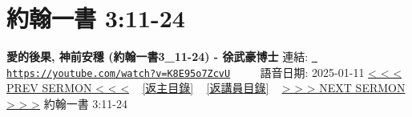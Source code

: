 \documentclass{book}
\begin{document}
\section{約翰一書 3:11-24}
\label{sec:K8E95o7ZcvU}
\textbf{愛的後果, 神前安穩 (約翰一書3\_11-24) - 徐武豪博士}
\newline
\newline
連結: \href{https://youtube.com/watch?v=K8E95o7ZcvU}{\texttt{ https://youtube.com/watch?v=K8E95o7ZcvU}} ~~~~ 語音日期: 2025-01-11 
\newline
\newline
\hyperref[sec:Y_0n0vkhyDU]{< < < PREV SERMON < < <}
~
\hyperlink{toc}{[返主目錄]}
~
\hyperref[ch:preacher4]{[返講員目錄]}
~
\hyperref[sec:qbcjpAyQDGE]{> > > NEXT SERMON > > >}
\newline
\newline
約翰一書 3:11-24
\newline
\end{document}
